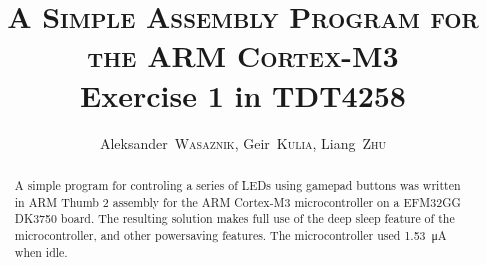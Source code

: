 \documentclass[a4,journal,twoside]{IEEEtran}
\title{
    \textsc{A Simple Assembly Program for the ARM Cortex-M3}\\
    Exercise 1 in TDT4258
}
\author{
    Aleksander~\textsc{Wasaznik},
    Geir~\textsc{Kulia},
    Liang~\textsc{Zhu}
}
\begin{document}
\maketitle

\begin{abstract}
    A simple program for controling a series of LEDs using gamepad buttons was written in ARM Thumb 2 assembly for the ARM Cortex-M3 microcontroller on a EFM32GG DK3750 board.
    The resulting solution makes full use of the deep sleep feature of the microcontroller, and other powersaving features.
    The microcontroller used \SI{1.53}{\micro\ampere} when idle.
\end{abstract}



\end{document}
